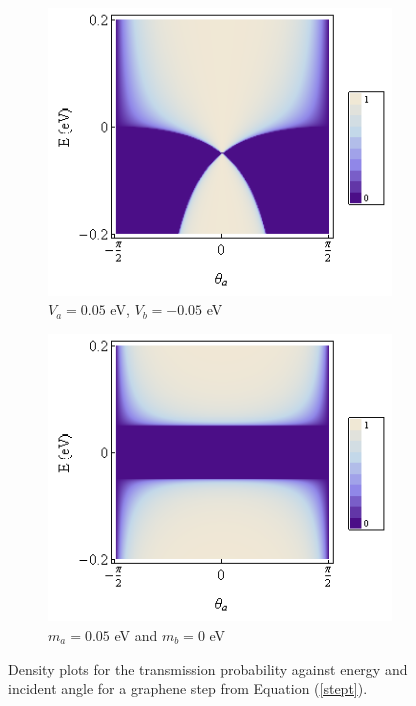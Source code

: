 		\begin{figure}[h]
			 \begin{subfigure}[h]{0.5\textwidth}
				\centerline{\includegraphics[scale=0.5]{images/step-1}}
				\caption{$V_{a}=0.05$ eV, $V_{b}=-0.05$ eV}
			\end{subfigure}
			\hspace{0.5cm}
			\begin{subfigure}[h]{0.5\textwidth}
				\centerline{\includegraphics[scale=0.5]{images/step-2}}
				\caption{$m_{a}=0.05$ eV and $m_{b}=0$ eV}
			\end{subfigure}
			\caption{Density plots for the transmission probability against energy and incident angle for a graphene step from Equation (\ref{stept}).}
			\label{step-1}
		\end{figure}
